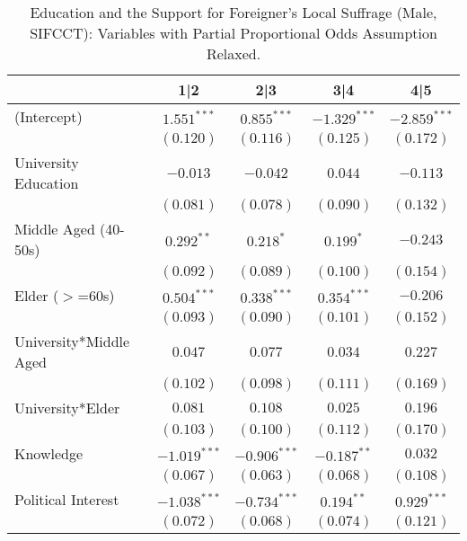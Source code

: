
\begin{table}
\caption{Education and the Support for Foreigner's Local Suffrage (Male, SIFCCT): Variables with Partial Proportional Odds Assumption Relaxed.}
\begin{center}
\begin{tabular}{l c c c c }
\toprule
 & 1|2 & 2|3 & 3|4 & 4|5 \\
\midrule
(Intercept)            & $1.551^{***}$  & $0.855^{***}$  & $-1.329^{***}$ & $-2.859^{***}$     \\
                       & $(0.120)$      & $(0.116)$      & $(0.125)$      & $(0.172)$          \\
University Education   & $-0.013$       & $-0.042$       & $0.044$        & $-0.113$           \\
                       & $(0.081)$      & $(0.078)$      & $(0.090)$      & $(0.132)$          \\
Middle Aged (40-50s)   & $0.292^{**}$   & $0.218^{*}$    & $0.199^{*}$    & $-0.243$           \\
                       & $(0.092)$      & $(0.089)$      & $(0.100)$      & $(0.154)$          \\
Elder ($>$=60s)        & $0.504^{***}$  & $0.338^{***}$  & $0.354^{***}$  & $-0.206$           \\
                       & $(0.093)$      & $(0.090)$      & $(0.101)$      & $(0.152)$          \\
University*Middle Aged & $0.047$        & $0.077$        & $0.034$        & $0.227$            \\
                       & $(0.102)$      & $(0.098)$      & $(0.111)$      & $(0.169)$          \\
University*Elder       & $0.081$        & $0.108$        & $0.025$        & $0.196$            \\
                       & $(0.103)$      & $(0.100)$      & $(0.112)$      & $(0.170)$          \\
Knowledge              & $-1.019^{***}$ & $-0.906^{***}$ & $-0.187^{**}$  & $0.032$            \\
                       & $(0.067)$      & $(0.063)$      & $(0.068)$      & $(0.108)$          \\
Political Interest     & $-1.038^{***}$ & $-0.734^{***}$ & $0.194^{**}$   & $0.929^{***}$      \\
                       & $(0.072)$      & $(0.068)$      & $(0.074)$      & $(0.121)$          \\

\end{tabular}
\end{center}
\end{table}
